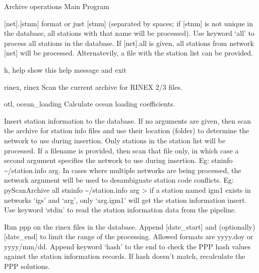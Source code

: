 \documentclass[letterpaper,10pt,english]{sphinxmanual}
\begin{document}
\sphinxAtStartPar
Archive operations Main Program
\begin{description}
\begin{description}
\sphinxAtStartPar
{[}net{]}.{[}stnm{]} format or just {[}stnm{]} (separated by
spaces; if {[}stnm{]} is not unique in the database, all
stations with that name will be processed). Use
keyword ‘all’ to process all stations in the database.
If {[}net{]}.all is given, all stations from network {[}net{]}
will be processed. Alternatevily, a file with the
station list can be provided.

\end{description}

\begin{optionlist}{3cm}
\item [\sphinxhyphen{}h, \sphinxhyphen{}\sphinxhyphen{}help]  
\sphinxAtStartPar
show this help message and exit
\item [\sphinxhyphen{}rinex, \sphinxhyphen{}\sphinxhyphen{}rinex]  
\sphinxAtStartPar
Scan the current archive for RINEX 2/3 files.
\item [\sphinxhyphen{}otl, \sphinxhyphen{}\sphinxhyphen{}ocean\_loading]  
\sphinxAtStartPar
Calculate ocean loading coefficients.
\end{optionlist}
\begin{description}
\sphinxAtStartPar
Insert station information to the database. If no
arguments are given, then scan the archive for station
info files and use their location (folder) to
determine the network to use during insertion. Only
stations in the station list will be processed. If a
filename is provided, then scan that file only, in
which case a second argument specifies the network to
use during insertion. Eg: \sphinxhyphen{}stninfo \textasciitilde{}/station.info arg.
In cases where multiple networks are being processed,
the network argument will be used to desambiguate
station code conflicts. Eg: pyScanArchive all \sphinxhyphen{}stninfo
\textasciitilde{}/station.info arg \sphinxhyphen{}\textgreater{} if a station named igm1 exists
in networks ‘igs’ and ‘arg’, only ‘arg.igm1’ will get
the station information insert. Use keyword ‘stdin’ to
read the station information data from the pipeline.

\sphinxAtStartPar
Run ppp on the rinex files in the database. Append
{[}date\_start{]} and (optionally) {[}date\_end{]} to limit the
range of the processing. Allowed formats are yyyy.doy
or yyyy/mm/dd. Append keyword ‘hash’ to the end to
check the PPP hash values against the station
information records. If hash doesn’t match,
recalculate the PPP solutions.


\end{description}
\end{description}
\end{document}
